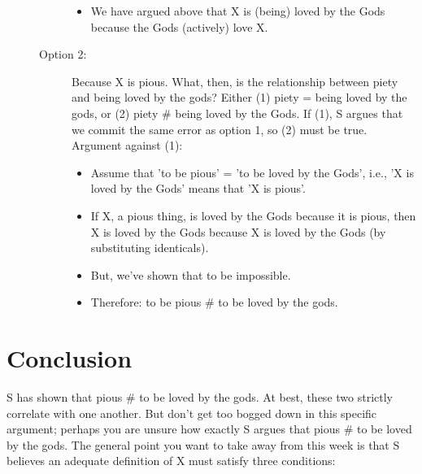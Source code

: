 \documentclass[oneside]{article}
\begin{document}
\begin{description}
\begin{description}
\begin{itemize}
\item We have argued above that X is  (being) loved by the Gods because the Gods (actively) love X.
\end{itemize}
\item[Option 2:] Because X is pious. What, then, is the relationship between piety and being loved by the gods? Either (1) piety = being loved by the gods, or (2) piety \# being loved by the Gods. If (1), S argues that we commit the same error as option 1, so (2) must be true. Argument against (1):
   \begin{itemize}
   \item Assume that 'to be pious' = 'to be loved by the Gods', i.e., 'X is loved by the Gods' means that 'X is pious'.
   \item If X, a pious thing, is loved by the Gods because it is pious, then X is loved by the Gods because X is loved by the Gods (by substituting identicals). 
  \item But, we've shown that to be impossible.
  \item Therefore: to be pious \# to be loved by the gods.
\end{itemize}
\end{description}
\end{description}

\section*{Conclusion}

S has shown that pious \# to be loved by the gods. At best, these two strictly correlate with one another. But don't get too bogged down in this specific argument; perhaps you are unsure how exactly S argues that pious \# to be loved by the gods. The general point you want to take away from this week is that S believes an adequate definition of X must satisfy three conditions: 
\end{document}
